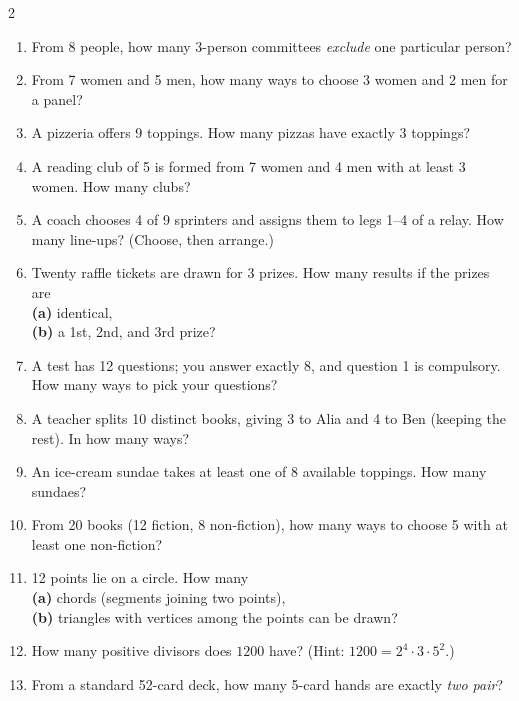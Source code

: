 \documentclass[11pt]{article}
\begin{document}
\begin{recapbox}
\begin{multicols}{2}
\small
\begin{enumerate}[leftmargin=*,itemsep=3pt]
  \item From 8 people, how many 3-person committees \emph{exclude} one particular person?
  \item From 7 women and 5 men, how many ways to choose 3 women and 2 men for a panel?
  \item A pizzeria offers 9 toppings. How many pizzas have exactly 3 toppings?
  \item A reading club of 5 is formed from 7 women and 4 men with at least 3 women. How many clubs?
  \item A coach chooses 4 of 9 sprinters and assigns them to legs 1--4 of a relay. How many line-ups? (Choose, then arrange.)
  \item Twenty raffle tickets are drawn for 3 prizes. How many results if the prizes are \\ \textbf{(a)} identical, \\ \textbf{(b)} a 1st, 2nd, and 3rd prize?
  \item A test has 12 questions; you answer exactly 8, and question 1 is compulsory. How many ways to pick your questions?
  \item A teacher splits 10 distinct books, giving 3 to Alia and 4 to Ben (keeping the rest). In how many ways?
  \item An ice-cream sundae takes at least one of 8 available toppings. How many sundaes?
  \item From 20 books (12 fiction, 8 non-fiction), how many ways to choose 5 with at least one non-fiction?
  \item 12 points lie on a circle. How many \\ \textbf{(a)} chords (segments joining two points), \\ \textbf{(b)} triangles with vertices among the points can be drawn?
  \item How many positive divisors does $1200$ have? (Hint: $1200=2^4\cdot3\cdot5^2$.)
  \item From a standard 52-card deck, how many 5-card hands are exactly \emph{two pair}?
\end{enumerate}
\end{multicols}
\end{recapbox}
\end{document}
